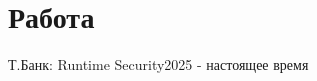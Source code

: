 \section{\textbf{Работа}}
\resumeSubHeadingListStart

\resumePOR
{Т.Банк: }{Runtime Security}{2025 - настоящее время}

\resumeSubHeadingListEnd
